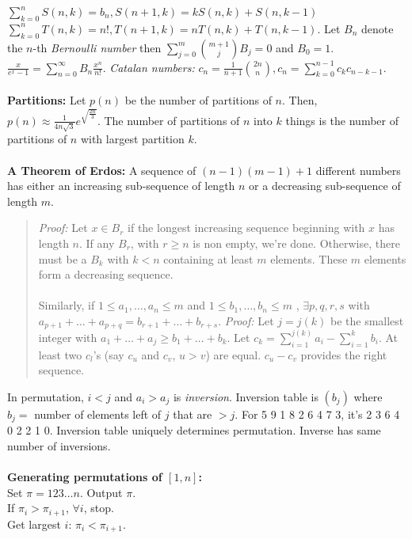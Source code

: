 $ \sum_{k=0}^{n} S(n,k) = b_{n} , S(n+1, k) = k S(n,k) + S(n, k-1)$
$ \sum_{k=0}^{n} T(n,k) = n! , T(n+1, k) = n T(n,k) + T(n, k-1)$.
Let $B_{n}$ denote the $n$-th \emph{Bernoulli number} then
$\sum_{j=0}^m {{m+1} \choose j} B_j = 0$
and $B_0=1$.  ${\frac x {e^x-1}} = \sum_{n=0}^{\infty} B_n {\frac {x^n} {n!}}$.
\emph{Catalan numbers:}
$c_{n} = \frac {1} {n+1} {2n \choose n} , c_n = \sum_{k=0}^{n-1} c_k c_{n-k-1}$.
\\
\\
{\bf Partitions:} Let $p(n)$ be the number of partitions of $n$.  Then,
$p(n) \approx \frac{1}{4n \sqrt{3}} e^{\sqrt{\frac {2n} {3}}}$.
The number of partitions of $n$ into $k$ things is the number of partitions
of $n$ with largest partition $k$.
\\
\\
{\bf A Theorem of Erdos:}
A sequence of $(n-1)(m-1) + 1$ different numbers has either an increasing
sub-sequence of length $n$ or a decreasing sub-sequence of length $m$.
\begin{quote}
\emph{Proof:} 
Let $x \in B_r$ if the longest increasing sequence beginning with
$x$ has length $n$.  If any $B_r$, with $r \geq n$ is non empty, we're done.
Otherwise, there must be a $B_k$ with $k<n$ containing at least $m$ elements.
These $m$ elements form a decreasing sequence.
\\
\\
Similarly, if $1 \leq a_1 , \ldots , a_n \leq m$ and
$1 \leq b_1 , \ldots , b_n \leq m$ ,  $\exists p,q,r,s$ with
$a_{p+1} + \ldots + a_{p+q} = b_{r+1} + \ldots + b_{r+s}$.
\emph{Proof:} Let $j=j(k)$ be the smallest integer with
$a_1 + \ldots + a_j \geq
b_1 + \ldots + b_k$.  Let $c_k = \sum_{i=1}^{j(k)} a_i - \sum_{i=1}^k b_i$.
At least two $c_l$'s (say $c_u$ and $c_v$, $u>v$) are equal.  $c_u-c_v$
provides the right sequence.
\end{quote}
In permutation, $i<j$ and $a_i > a_j$ is \emph{inversion}.  Inversion table is
$( b_j )$ where $b_j =$ number of elements left of $j$ that are $>j$.
For 5 9 1 8 2 6 4 7 3, it's 2 3 6 4 0 2 2 1 0.  Inversion table uniquely
determines permutation.  Inverse has same number of inversions.
\\
\\
{\bf Generating permutations of $[1,n]$:}\\
\jt Set $\pi = 123 \ldots n$.  Output $\pi$.\\
\jt If $\pi_i > \pi_{i+1}$, $\forall i$, stop.\\
\jt Get largest $i$: $\pi_i < \pi_{i+1}$.\\
